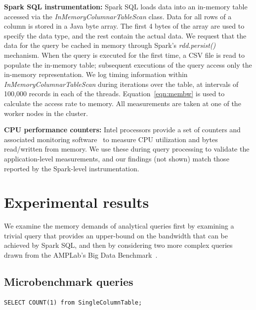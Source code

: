 \documentclass[9pt]{sig-alternate-05-2015}
\renewcommand{\paragraph}[1]{{\bf #1}}
\begin{document}
\paragraph{Spark SQL instrumentation:} Spark SQL loads data into an in-memory
table accessed via the {\it InMemoryColumnarTableScan} class. Data for all rows
of a column is stored in a Java byte array. The first 4 bytes of the array are
used to specify the data type, and the rest contain the actual data.  We
request that the data for the query be cached in memory through Spark's {\it
rdd.persist()} mechanism.  When the query is executed for the first time, a CSV
file is read to populate the in-memory table; subsequent executions of the
query access only the in-memory representation.  We log timing information
within {\it InMemoryColumnarTableScan} during iterations over the table, at
intervals of 100,000 records in each of the threads. Equation~\ref{eqn:membw}
is used to calculate the access rate to memory.  All measurements are taken at
one of the worker nodes in the cluster.

\paragraph{CPU performance counters:} Intel processors provide a set of
counters and associated monitoring software~\cite{intelPerf} to measure CPU
utilization and bytes read/written from memory.  We use these during query
processing to validate the application-level measurements, and our findings
(not shown) match those reported by the Spark-level instrumentation.

\section{Experimental results}

We examine the memory demands of analytical queries first by examining a
trivial query that provides an upper-bound on the bandwidth that can be
achieved by Spark SQL, and then by considering two more complex queries drawn
from the AMPLab's Big Data Benchmark~\cite{amplab_benchmark}.

\subsection{Microbenchmark queries}

\begin{Verbatim}[frame=single,label=Query 1]
SELECT COUNT(1) from SingleColumnTable;
\end{Verbatim}
\end{document}
